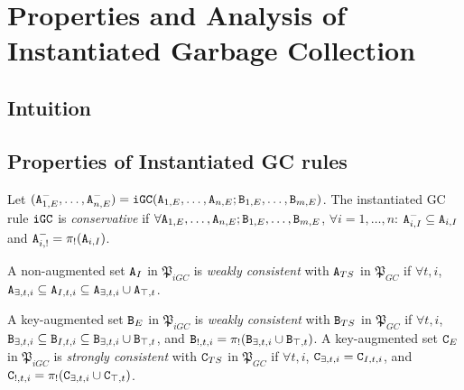 
\section{Properties and Analysis of Instantiated Garbage Collection}
\label{sec:instantiated}



\setcounter{subsection}{-1}
\subsection{Intuition}

\subsection{Properties of Instantiated GC rules}
\begin{property}\label{property:instantiated_gc_conservative}
Let $(\tt{A}_{1,E}^-, \dots, \tt{A}_{n,E}^-) = \tt{iGC}(\tt{A}_{1,E}, \dots, \tt{A}_{n,E}; \tt{B}_{1,E}, \dots, \tt{B}_{m,E})$.
The instantiated GC rule $\tt{iGC}$ is \emph{conservative} if $\forall \tt{A}_{1,E}, \dots, \tt{A}_{n,E}; \tt{B}_{1,E}, \dots, \tt{B}_{m,E}$, $\forall i=1,\dots,n$: $\tt{A}_{i,I}^- \subseteq \tt{A}_{i,I}$ and $\tt{A}_{i,!}^- = \pi_!(\tt{A}_{i,I})$.
\end{property}

\begin{property}
A non-augmented set $\tt{A}_I$ in $\mathfrak{P}_{iGC}$ is \emph{weakly consistent} with $\tt{A}_{TS}$ in $\mathfrak{P}_{GC}$ if $\forall t, i$, $\tt{A}_{\exists,t,i} \subseteq \tt{A}_{I,t,i} \subseteq \tt{A}_{\exists,t,i} \cup \tt{A}_{\top,t}$.

A key-augmented set $\tt{B}_E$ in $\mathfrak{P}_{iGC}$ is \emph{weakly consistent} with $\tt{B}_{TS}$ in $\mathfrak{P}_{GC}$ if $\forall t, i$, $\tt{B}_{\exists,t,i} \subseteq \tt{B}_{I,t,i} \subseteq \tt{B}_{\exists,t,i} \cup \tt{B}_{\top,t}$, and $\tt{B}_{!,t,i} = \pi_!(\tt{B}_{\exists,t,i} \cup \tt{B}_{\top,t})$.
A key-augmented set $\tt{C}_E$ in $\mathfrak{P}_{iGC}$ is \emph{strongly consistent} with $\tt{C}_{TS}$ in $\mathfrak{P}_{GC}$ if $\forall t, i$, $\tt{C}_{\exists,t,i} = \tt{C}_{I,t,i}$, and $\tt{C}_{!,t,i} = \pi_!(\tt{C}_{\exists,t,i} \cup \tt{C}_{\top,t})$.
\end{property}

